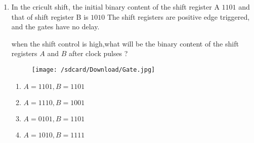 \documentclass[20pt,-letter paper]{article}
\title{}
\date{\today}
\begin{document}

\begin{enumerate}

\item In the cricult shift, the initial binary content of the shift register A $1101$ and that of shift register B is $1010$ The shift registers are positive edge triggered, and the gates have no delay.

when the shift control is high,what will be the binary content of the shift registers $A$ and $B$ after clock pulses ?


\begin {figure}[h]
 \centering
 \texttt{[image: /sdcard/Download/Gate.jpg]}
\end{figure}

\begin{enumerate}
\item $A= 1101,B=1101$
\item $A=1110 ,B=1001$
\item $A=0101 ,B=1101$
\item $A=1010 ,B=1111$
\end {enumerate}
\end {enumerate}
\end{document}
